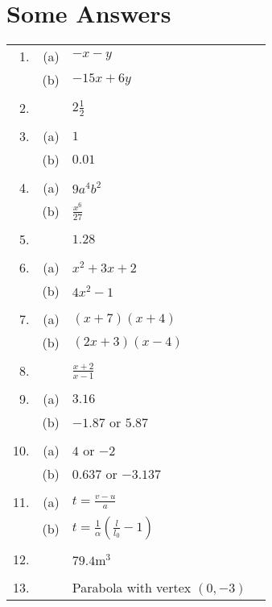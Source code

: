 \section*{Some Answers}
\begin{tabular}[c]{rrlr}1.  & (a)
	& $ -x -y$  &  \\
	& (b)
	& $ -15 x +6 y$  &  \\
	&  &  &  \\
	2.
	&  & $2\frac{1}{2}$  &  \\
	&  &  &  \\
	3.
	& (a)  & $1$  &  \\
	& (b)
	& $0.01$  &  \\
	&  &  &  \\
	4.
	& (a)  & $9 a^{4} b^{2}$  &  \\
	& (b)
	& $\frac{x^{6}}{27}$  &  \\
	&  &  &  \\
	5.
	&  & $1.28$  &  \\
	&  &  &  \\
	6.
	& (a)  & $x^{2} +3 x +2$  &  \\
	& (b)
	& $4 x^{2} -1$  &  \\
	&  &  &  \\
	7.
	& (a)  & $\left (x +7\right ) \left (x +4\right )$  &  \\
	& (b)
	& $\left (2 x +3\right ) \left (x -4\right )$  &  \\
	&  &  &  \\
	8.
	&  & $\frac{x +2}{x -1}$  &  \\
	&  &  &  \\
	9.
	& (a)  & $3.16$  &  \\
	& (b)
	& $ -1.87$ or $5.87$  &  \\
	&  &  &  \\
	10.
	& (a)  & $4$ or $ -2$  &  \\
	& (b)
	& $0.637$ or $ -3.137$  &  \\
	&  &  &  \\
	11.
	& (a)  & $t =\frac{v -u}{a}$  &  \\
	& (b)
	& $t =\frac{1}{\alpha } \left (\frac{l}{l_{0}} -1\right )$  &  \\
	&  &  &  \\
	12.
	&  & $79.4 \mathrm{m}^{3}$  &  \\
	&  &  &  \\
	13.
	&  & Parabola with vertex $\left (0 , -3\right )$  & 
\end{tabular}

\relax    
\setlength\fboxrule{0.01in}\setlength\fboxsep{0.2in}
\\ 
\\



